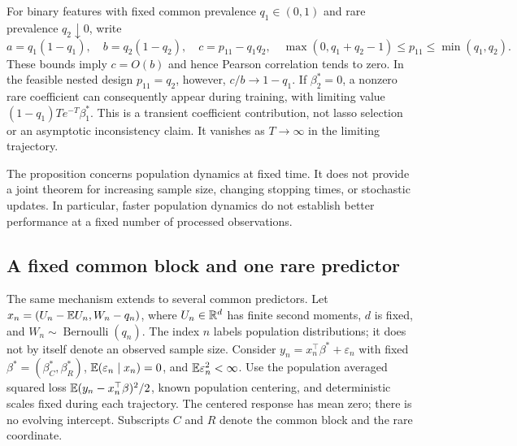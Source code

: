 For binary features with fixed common prevalence $q_1 \in (0,1)$ and rare
prevalence $q_2 \downarrow 0$, write
\[
 a = q_1(1 - q_1),\quad b
   = q_2(1 - q_2),\quad c
   = p_{11} - q_1q_2, \quad \max(0,q_1 + q_2 - 1)
   \le p_{11}
   \le \min(q_1,q_2).
\]
These bounds imply $c = O(b)$ and hence Pearson correlation tends to zero. In
the feasible nested design $p_{11} = q_2$, however, $c/b \to 1 - q_1$. If
$\beta_2^* = 0$, a nonzero rare coefficient can consequently appear during
training, with limiting value $(1 - q_1)T e^{-T}\beta_1^*$. This is a transient
coefficient contribution, not lasso selection or an asymptotic inconsistency
claim. It vanishes as $T \to \infty$ in the limiting trajectory.

The proposition concerns population dynamics at fixed time. It does not provide
a joint theorem for increasing sample size, changing stopping times, or
stochastic updates. In particular, faster population dynamics do not establish
better performance at a fixed number of processed observations.

\subsection{A fixed common block and one rare predictor}

The same mechanism extends to several common predictors. Let
$x_n = (U_n - \mathbb{E} U_n,W_n - q_n)$, where $U_n \in \mathbb{R}^d$ has finite second
moments, $d$ is fixed, and $W_n \sim \operatorname{Bernoulli}(q_n)$. The index
$n$ labels population distributions; it does not by itself denote an observed
sample size. Consider $y_n = x_n^\top\beta^* + \varepsilon_n$ with fixed
$\beta^* = (\beta_C^*,\beta_R^*)$, $\mathbb{E}(\varepsilon_n \mid x_n) = 0$, and
$\mathbb{E}\varepsilon_n^2 < \infty$. Use the population averaged squared loss
$\mathbb{E}(y_n - x_n^\top\beta)^2/2$, known population centering, and deterministic
scales fixed during each trajectory. The centered response has mean zero; there
is no evolving intercept. Subscripts $C$ and $R$ denote the common block and the
rare coordinate.

